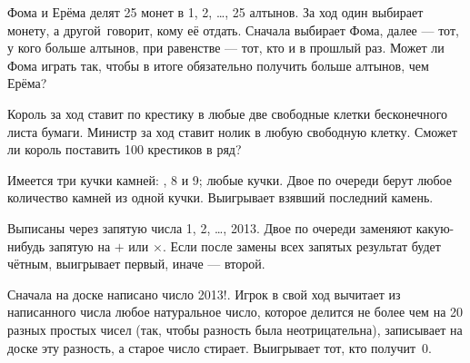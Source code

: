 \documentclass[a4paper,11pt]{article}
\begin{document}
Фома и Ерёма делят 25 монет в 1, 2, \dots, 25
алтынов.  За ход один выбирает монету, а другой~говорит,
кому её отдать. Сначала выбирает Фома, далее --- тот, у кого
больше алтынов, при равенстве --- тот, кто и в прошлый раз.  Может ли
Фома играть так, чтобы в итоге обязательно получить больше алтынов,
чем Ерёма?


\vspace*{-1truemm}






Король за ход ставит по крестику в любые две свободные клетки
бесконечного листа бумаги. Министр за ход ставит нолик в любую
свободную клетку. Сможет ли король поставить 100 крестиков в ряд?


 Имеется три кучки камней:
, 8 и 9;
 любые кучки. Двое по очереди берут любое количество камней из
одной кучки.
Выигрывает взявший последний камень.

Выписаны через запятую числа 1, 2, \dots, 2013.
Двое по очереди заменяют какую-нибудь запятую на $+$ или $\times$.
Если после замены всех запятых результат будет чётным,
выигрывает первый, иначе --- второй.

Сначала на доске написано число 2013!.
Игрок в свой ход вычитает
из написанного  числа любое натуральное число,  которое
делится не более  чем  на 20 разных простых чисел (так,  чтобы
разность была неотрицательна), записывает  на  доске эту разность,
а старое число стирает. Выигрывает тот, кто получит~0.

\vspace*{-2mm}
\vspace*{-3mm}


\end{document}
